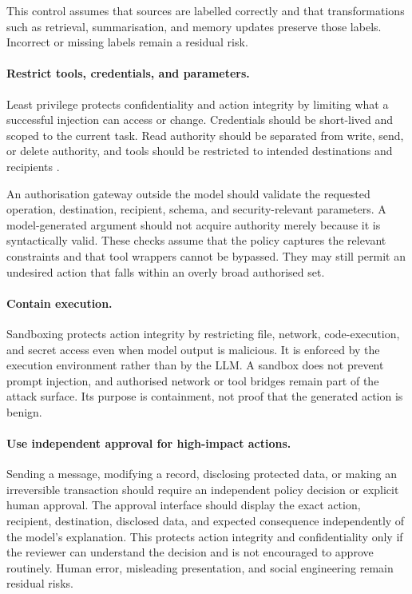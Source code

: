 This control assumes that sources are labelled correctly and that transformations
such as retrieval, summarisation, and memory updates preserve those labels.
Incorrect or missing labels remain a residual risk.

\paragraph{Restrict tools, credentials, and parameters.}

Least privilege protects confidentiality and action integrity by limiting what a
successful injection can access or change. Credentials should be short-lived and
scoped to the current task. Read authority should be separated from write, send,
or delete authority, and tools should be restricted to intended destinations and
recipients
\parencites{debenedetti2024agentdojo}{debenedetti2025defeating}
{owasp2025llm}.

An authorisation gateway outside the model should validate the requested
operation, destination, recipient, schema, and security-relevant parameters. A
model-generated argument should not acquire authority merely because it is
syntactically valid. These checks assume that the policy captures the relevant
constraints and that tool wrappers cannot be bypassed. They may still permit an
undesired action that falls within an overly broad authorised set.

\paragraph{Contain execution.}

Sandboxing protects action integrity by restricting file, network, code-execution,
and secret access even when model output is malicious. It is enforced by the
execution environment rather than by the LLM. A sandbox does not prevent prompt
injection, and authorised network or tool bridges remain part of the attack
surface. Its purpose is containment, not proof that the generated action is
benign.

\paragraph{Use independent approval for high-impact actions.}

Sending a message, modifying a record, disclosing protected data, or making an
irreversible transaction should require an independent policy decision or
explicit human approval. The approval interface should display the exact action,
recipient, destination, disclosed data, and expected consequence independently
of the model's explanation. This protects action integrity and confidentiality
only if the reviewer can understand the decision and is not encouraged to
approve routinely. Human error, misleading presentation, and social engineering
remain residual risks.

